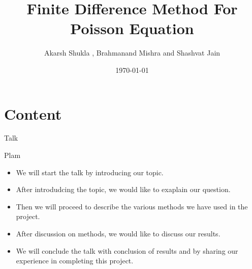 \documentclass[9 pt]{beamer}
\title{Finite Difference Method For Poisson Equation}
\date{\today}
\author{Akarsh Shukla , Brahmanand Mishra and Shashvat Jain}
\begin{document}
\maketitle

\section{Content}
	\begin{frame}{Talk}
			\begin{block}{Plam}
				\begin{itemize}
					
					\item We will start the talk by \alert{introducing} our topic.
					\item After introdudcing the topic, we would like to exaplain our \alert{ question}. 
					\item Then we will proceed to describe the various \alert{methods} we have used in the project.
					\item After discussion on methods, we would like to discuss our \alert{results}.
					\item We will conclude the talk with \alert{conclusion} of results and by sharing our \alert{experience} in completing this project.
					
				\end{itemize}
			\end{block}
		
	\end{frame}
\end{document}
